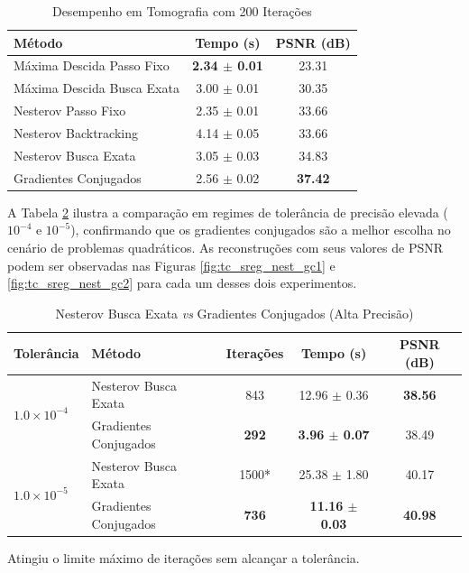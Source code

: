 \documentclass[12pt]{article}
\begin{document}
\begin{table}[H]
    \centering
    \caption{Desempenho em Tomografia com 200 Iterações}
    \label{tab:tc_sem_reg_200it}
    \begin{tabular}{lcc}
        \toprule
        \textbf{Método} & \textbf{Tempo (s)} & \textbf{PSNR (dB)} \\
        \midrule
        Máxima Descida Passo Fixo & \textbf{2.34 $\pm$ 0.01} & 23.31 \\
        Máxima Descida Busca Exata & 3.00 $\pm$ 0.01 & 30.35 \\
        Nesterov Passo Fixo & 2.35 $\pm$ 0.01 & 33.66 \\
        Nesterov Backtracking & 4.14 $\pm$ 0.05 & 33.66 \\
        Nesterov Busca Exata & 3.05 $\pm$ 0.03 & 34.83 \\
        Gradientes Conjugados & 2.56 $\pm$ 0.02 & \textbf{37.42} \\
        \bottomrule
    \end{tabular}
\end{table}

A Tabela \ref{tab:tc_sem_reg_nest_vs_gc} ilustra a comparação em regimes de tolerância de precisão elevada ($10^{-4}$ e $10^{-5}$), confirmando que os gradientes conjugados são a melhor escolha no cenário de problemas quadráticos. As reconstruções com seus valores de PSNR podem ser observadas nas Figuras \ref{fig:tc_sreg_nest_gc1} e \ref{fig:tc_sreg_nest_gc2} para cada um desses dois experimentos.

\begin{table}[H]
    \centering
    \caption{Nesterov Busca Exata \textit{vs} Gradientes Conjugados (Alta Precisão)}
    \label{tab:tc_sem_reg_nest_vs_gc}
    \begin{tabular}{llccc}
        \toprule
        \textbf{Tolerância} & \textbf{Método} & \textbf{Iterações} & \textbf{Tempo (s)} & \textbf{PSNR (dB)} \\
        \midrule
        \multirow{2}{*}{$1.0 \times 10^{-4}$} & Nesterov Busca Exata & 843 & 12.96 $\pm$ 0.36 & \textbf{38.56} \\
        & Gradientes Conjugados & \textbf{292} & \textbf{3.96 $\pm$ 0.07} & 38.49 \\
        \midrule
        \multirow{2}{*}{$1.0 \times 10^{-5}$} & Nesterov Busca Exata & 1500* & 25.38 $\pm$ 1.80 & 40.17 \\
        & Gradientes Conjugados & \textbf{736} & \textbf{11.16 $\pm$ 0.03} & \textbf{40.98} \\
        \bottomrule
    \end{tabular}
    
    \vspace{0.1cm}
    {\footnotesize *Atingiu o limite máximo de iterações sem alcançar a tolerância.}
\end{table}
\end{document}
